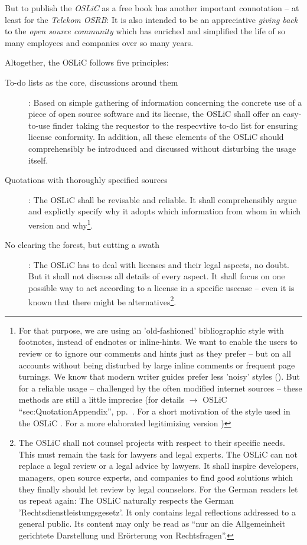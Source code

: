 But to publish the \emph{OSLiC} as a free book has another important connotation --
at least for the \emph{Telekom OSRB}: It is also intended to be an appreciative
\emph{giving back} to the \emph{open source community} which has enriched and
simplified the life of so many employees and companies over so many years.

Altogether, the OSLiC follows five principles:

\begin{description}
  \item[To-do lists as the core, discussions around them]: Based on simple
  gathering of information concerning the concrete use of a piece of open source
  software and its license, the OSLiC shall offer an easy-to-use finder taking
  the requestor to the respecvtive to-do list for ensuring license conformity.
  In addition, all these elements of the OSLiC should comprehensibly be
  introduced and discussed without disturbing the usage itself.

  \item[Quotations with thoroughly specified sources]\label{QuotationPrinciple}:
  The OSLiC shall be revisable and reliable. It shall comprehensibly argue and
  explictly specify why it adopts which information from whom in which version
  and why\footnote{For that purpose, we are using an 'old-fashioned'
  bibliographic style with footnotes, instead of endnotes or inline-hints.
  We want to enable the users to review or to ignore our comments and hints just
  as they prefer -- but on all accounts without being disturbed by large inline
  comments or frequent page turnings. We know that modern writer guides prefer
  less 'noisy' styles (\cite[pars pro toto cf.][\nopage passim]{Mla2009a}). But
  for a reliable usage -- challenged by the often modified internet sources --
  these methods are still a little imprecise (for details $\rightarrow$ OSLiC
  \enquote{sec:QuotationAppendix}, pp.\ \pageref{sec:QuotationAppendix}. For a
  short motivation of the style used in the OSLiC \cite[cf.][\nopage
  passim]{Reincke2012a}. For a more elaborated legitimizing version
  \cite[cf.][\nopage passim]{Reincke2012b}) }.

  \item[No clearing the forest, but cutting a swath]: The OSLiC has to deal with
  licenses and their legal aspects, no doubt. But it shall not discuss all
  details of every aspect. It shall focus on one possible way to act according
  to a license in a specific usecase -- even it is known that there might be
  alternatives\footnote{The OSLiC shall not counsel projects with respect to
  their specific needs. This must remain the task for lawyers and legal experts.
  The OSLiC can not replace a legal review or a legal advice by lawyers. It shall
  inspire developers, managers, open source experts, and companies to find good
  solutions which they finally should let review by legal counselors. For the
  German readers let us repeat again: The OSLiC naturally respects the German
  'Rechtsdienstleistungsgesetz'. It only contains legal reflections addressed to
  a general public. Its content may only be read as \enquote{nur an die
  Allgemeinheit gerichtete Darstellung und Erörterung von Rechtsfragen}.}.
  

\end{description}

